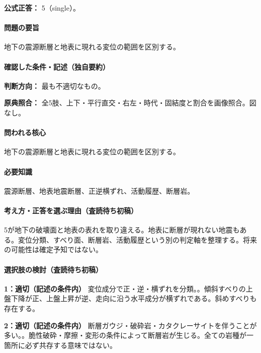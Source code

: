\textbf{公式正答：} 5（single）。

\paragraph{問題の要旨} 地下の震源断層と地表に現れる変位の範囲を区別する。

\paragraph{確認した条件・記述（独自要約）}\mbox{}\par

\noindent\textbf{判断方向：} 最も不適切なもの。\par

\noindent\textbf{原典照合：} 全5肢、上下・平行直交・右左・時代・固結度と割合を画像照合。図なし。\par

\paragraph{問われる核心} 地下の震源断層と地表に現れる変位の範囲を区別する。

\paragraph{必要知識} 震源断層、地表地震断層、正逆横ずれ、活動履歴、断層岩。

\paragraph{考え方・正答を選ぶ理由（査読待ち初稿）} 5が地下の破壊面と地表の表れを取り違える。地表に断層が現れない地震もある。変位分類、すべり面、断層岩、活動履歴という別の判定軸を整理する。将来の可能性は確定予知ではない。

\paragraph{選択肢の検討（査読待ち初稿）}\mbox{}\par

\noindent\textbf{1：適切（記述の条件内）} 変位成分で正・逆・横ずれを分類。。傾斜すべりの上盤下降が正、上盤上昇が逆、走向に沿う水平成分が横ずれである。斜めすべりも存在する。\par

\noindent\textbf{2：適切（記述の条件内）} 断層ガウジ・破砕岩・カタクレーサイトを伴うことが多い。。脆性破砕・摩擦・変形の条件によって断層岩が生じる。全ての岩種が一箇所に必ず共存する意味ではない。\par

